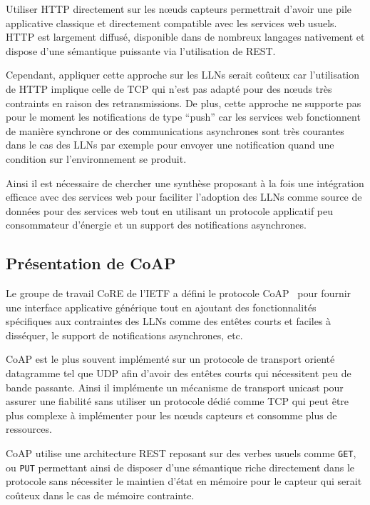 Utiliser \ac{HTTP} directement sur les nœuds capteurs permettrait d'avoir une pile applicative classique et directement compatible avec les services web usuels.
\ac{HTTP} est largement diffusé, disponible dans de nombreux langages nativement et dispose d'une sémantique puissante via l'utilisation de \ac{REST}.

Cependant, appliquer cette approche sur les \ac{LLN}s serait coûteux car l'utilisation de \ac{HTTP} implique celle de \ac{TCP} qui n'est pas adapté pour des nœuds très contraints en raison des retransmissions.
De plus, cette approche ne supporte pas pour le moment les notifications de type ``push'' car les services web fonctionnent de manière synchrone or des communications asynchrones sont très courantes dans le cas des \ac{LLN}s par exemple pour envoyer une notification quand une condition sur l'environnement se produit.

Ainsi il est nécessaire de chercher une synthèse proposant à la fois une intégration efficace avec des services web pour faciliter l'adoption des \ac{LLN}s comme source de données pour des services web tout en utilisant un protocole applicatif peu consommateur d'énergie et un support des notifications asynchrones.

\subsection{Présentation de \ac{CoAP}}

Le groupe de travail \ac{CoRE} de l'\ac{IETF} a défini le protocole \ac{CoAP}~\cite{rfc7252} pour fournir une interface applicative générique tout en ajoutant des fonctionnalités spécifiques aux contraintes des \ac{LLN}s comme des entêtes courts et faciles à disséquer, le support de notifications asynchrones, etc.

\ac{CoAP} est le plus souvent implémenté sur un protocole de transport orienté datagramme tel que \ac{UDP} afin d'avoir des entêtes courts qui nécessitent peu de bande passante.
Ainsi il implémente un mécanisme de transport unicast pour assurer une fiabilité sans utiliser un protocole dédié comme \ac{TCP} qui peut être plus complexe à implémenter pour les nœuds capteurs et consomme plus de ressources.

\ac{CoAP} utilise une architecture \ac{REST} reposant sur des verbes usuels comme \texttt{GET}, ou \texttt{PUT} permettant ainsi de disposer d'une sémantique riche directement dans le protocole sans nécessiter le maintien d'état en mémoire pour le capteur qui serait coûteux dans le cas de mémoire contrainte.

